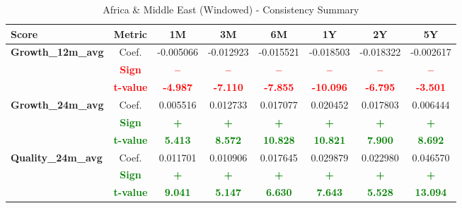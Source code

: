 \documentclass[11pt,english,a4paper,hidelinks]{book}
\begin{document}
\begin{table}[H]
    \centering
    \caption{Africa \& Middle East (Windowed) - Consistency Summary}
    \begin{tabular}{lccccccc}
        \toprule
        \textbf{Score} & \textbf{Metric} & \textbf{1M} & \textbf{3M} & \textbf{6M} & \textbf{1Y} & \textbf{2Y} & \textbf{5Y} \\
        \midrule
        \multirow{3}{*}{\textbf{Growth\_12m\_avg}}
            & Coef.   & -0.005066 & -0.012923 & -0.015521 & -0.018503 & -0.018322 & -0.002617 \\
            & \textbf{\textcolor{red}{Sign}}    & \textbf{\textcolor{red}{–}} & \textbf{\textcolor{red}{–}} & \textbf{\textcolor{red}{–}} & \textbf{\textcolor{red}{–}} & \textbf{\textcolor{red}{–}} & \textbf{\textcolor{red}{–}} \\
            & \textbf{\textcolor{red}{t-value}} & \textbf{\textcolor{red}{-4.987}} & \textbf{\textcolor{red}{-7.110}} & \textbf{\textcolor{red}{-7.855}} & \textbf{\textcolor{red}{-10.096}} & \textbf{\textcolor{red}{-6.795}} & \textbf{\textcolor{red}{-3.501}} \\
        \multirow{3}{*}{\textbf{Growth\_24m\_avg}}
            & Coef.   & 0.005516 & 0.012733 & 0.017077 & 0.020452 & 0.017803 & 0.006444 \\
            & \textbf{\textcolor{green}{Sign}}    & \textbf{\textcolor{green}{+}} & \textbf{\textcolor{green}{+}} & \textbf{\textcolor{green}{+}} & \textbf{\textcolor{green}{+}} & \textbf{\textcolor{green}{+}} & \textbf{\textcolor{green}{+}} \\
            & \textbf{\textcolor{green}{t-value}} & \textbf{\textcolor{green}{5.413}} & \textbf{\textcolor{green}{8.572}} & \textbf{\textcolor{green}{10.828}} & \textbf{\textcolor{green}{10.821}} & \textbf{\textcolor{green}{7.900}} & \textbf{\textcolor{green}{8.692}} \\
        \midrule
        \multirow{3}{*}{\textbf{Quality\_24m\_avg}}
            & Coef.   & 0.011701 & 0.010906 & 0.017645 & 0.029879 & 0.022980 & 0.046570 \\
            & \textbf{\textcolor{green}{Sign}}    & \textbf{\textcolor{green}{+}} & \textbf{\textcolor{green}{+}} & \textbf{\textcolor{green}{+}} & \textbf{\textcolor{green}{+}} & \textbf{\textcolor{green}{+}} & \textbf{\textcolor{green}{+}} \\
            & \textbf{\textcolor{green}{t-value}} & \textbf{\textcolor{green}{9.041}} & \textbf{\textcolor{green}{5.147}} & \textbf{\textcolor{green}{6.630}} & \textbf{\textcolor{green}{7.643}} & \textbf{\textcolor{green}{5.528}} & \textbf{\textcolor{green}{13.094}} \\

\end{tabular}
\end{table}
\end{document}
